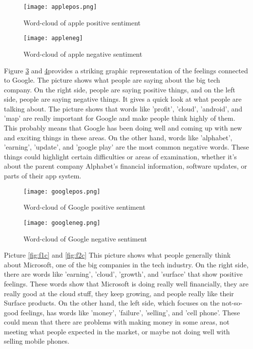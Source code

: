 \documentclass[12pt, a4paper,twoside]{report}
\theoremstyle{plain} %
\theoremstyle{definition} %
\theoremstyle{remark} %
\numberwithin{equation}{chapter}
\begin{document}
    \begin{figure}
      \centering
      \texttt{[image: applepos.png]}
      \caption{Word-cloud of apple positive sentiment}\label{fig:f1}
    \end{figure}
    \begin{figure}
      \centering
      \texttt{[image: appleneg]}
      \caption{Word-cloud of apple  negative sentiment}\label{fig:f2}
    \end{figure}
    Figure \ref{fig:f1b} and \ref{fig:f2b}provides a striking graphic representation of the feelings connected to Google. The picture shows what people are saying about the big tech company. On the right side, people are saying positive things, and on the left side, people are saying negative things. It gives a quick look at what people are talking about. The picture shows that words like 'profit', 'cloud', 'android', and 'map' are really important for Google and make people think highly of them. This probably means that Google has been doing well and coming up with new and exciting things in these areas. On the other hand, words like 'alphabet', 'earning', 'update', and 'google play' are the most common negative words. These things could highlight certain difficulties or areas of examination, whether it's about the parent company Alphabet's financial information, software updates, or parts of their app system. 

    
    \begin{figure}
      \centering
      \texttt{[image: googlepos.png]}\label{fig:f1b}
      \caption{Word-cloud of Google positive  sentiment}
    \end{figure}
\begin{figure}
      \centering
    \texttt{[image: googleneg.png]}\label{fig:f2b}
      \caption{Word-cloud of Google negative sentiment}
\end{figure}

    Picture \ref{fig:f1c} and \ref{fig:f2c} This picture shows what people generally think about Microsoft, one of the big companies in the tech industry. On the right side, there are words like 'earning', 'cloud', 'growth', and 'surface' that show positive feelings. These words show that Microsoft is doing really well financially, they are really good at the cloud stuff, they keep growing, and people really like their Surface products. On the other hand, the left side, which focuses on the not-so-good feelings, has words like 'money', 'failure', 'selling', and 'cell phone'. These could mean that there are problems with making money in some areas, not meeting what people expected in the market, or maybe not doing well with selling mobile phones.
\end{document}
